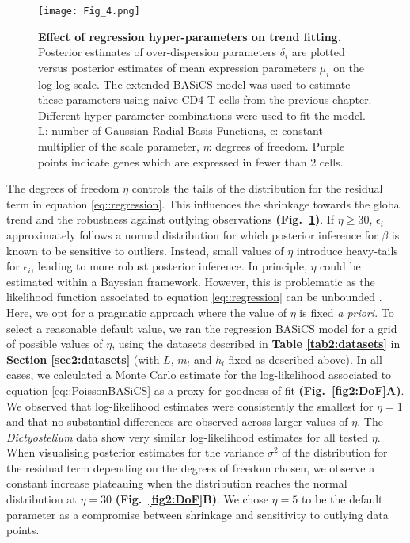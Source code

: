 \begin{figure}[!h]
\centering
\texttt{[image: Fig\_4.png]}
\caption[Effect of regression hyper-parameters on trend fitting]{\textbf{Effect of regression hyper-parameters on trend fitting.}\\
Posterior estimates of over-dispersion parameters $\delta_i$ are plotted versus posterior estimates of mean expression parameters $\mu_i$ on the log-log scale. The extended BASiCS model was used to estimate these parameters using naive CD4\plus{} T cells from the previous chapter. Different hyper-parameter combinations were used to fit the model. L: number of Gaussian Radial Basis Functions, c: constant multiplier of the scale parameter, $\eta$: degrees of freedom. Purple points indicate genes which are expressed in fewer than 2 cells.}
\label{fig2:choice_hyper}
\end{figure}

\newpage

The degrees of freedom $\eta$ controls the tails of the distribution for the residual term in equation \eqref{eq::regression}. This influences the shrinkage towards the global trend and the robustness against outlying observations \textbf{(Fig.~\ref{fig2:choice_hyper})}.  If $\eta \geq 30$, $\epsilon_i$ approximately follows a normal distribution for which posterior inference for $\beta$ is known to be sensitive to outliers. Instead, small values of $\eta$ introduce heavy-tails for $\epsilon_i$, leading to more robust posterior inference. In principle, $\eta$ could be estimated within a Bayesian framework. However, this is problematic as the likelihood function associated to equation \eqref{eq::regression} can be unbounded \citep{Fernandez1999}. Here, we opt for a pragmatic approach where the value of $\eta$ is fixed \emph{a priori}. To select a reasonable default value, we ran the regression BASiCS model for a grid of possible values of $\eta$, using the datasets described in \textbf{Table \ref{tab2:datasets}} in \textbf{Section \ref{sec2:datasets}} (with $L$, $m_l$ and $h_l$ fixed as described above). In all cases, we calculated a Monte Carlo estimate for the log-likelihood associated to equation \eqref{eq::PoissonBASiCS} as a proxy for goodness-of-fit \textbf{(Fig.~\ref{fig2:DoF}A)}. We observed that log-likelihood estimates were consistently the smallest for $\eta=1$ and that no substantial differences are observed across larger values of $\eta$. The \textit{Dictyostelium} data show very similar log-likelihood estimates for all tested $\eta$.  When visualising posterior estimates for the variance $\sigma^2$ of the distribution for the residual term depending on the degrees of freedom chosen, we observe a constant increase plateauing when the distribution reaches the normal distribution at $\eta=30$ \textbf{(Fig.~\ref{fig2:DoF}B)}. We chose $\eta=5$ to be the default parameter as a compromise between shrinkage and sensitivity to outlying data points. 

